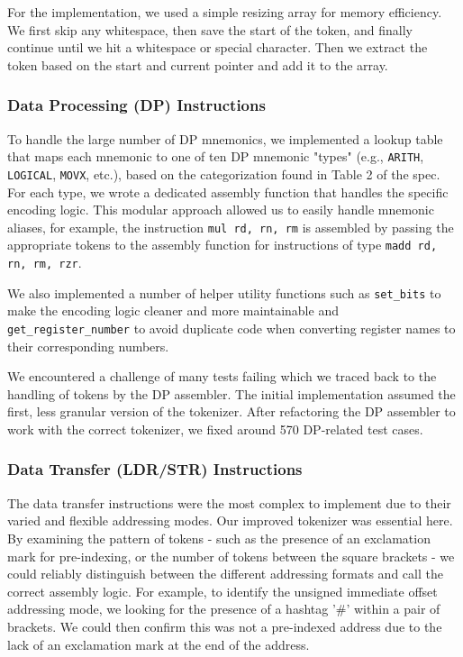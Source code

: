 \documentclass[11pt]{article}
\begin{document}
For the implementation, we used a simple resizing array for memory efficiency.
We first skip any whitespace, then save the start of the token, and finally continue until we hit a whitespace or special character.
Then we extract the token based on the start and current pointer and add it to the array.

\subsubsection{Data Processing (DP) Instructions}
To handle the large number of DP mnemonics, we implemented a lookup table that maps each mnemonic to one of ten DP mnemonic "types" 
(e.g., \texttt{ARITH}, \texttt{LOGICAL}, \texttt{MOVX}, etc.), based on the categorization found in Table 2 of the spec.
For each type, we wrote a dedicated assembly function that handles the specific encoding logic. 
This modular approach allowed us to easily handle mnemonic aliases, for example, the instruction \texttt{mul rd, rn, rm} is 
assembled by passing the appropriate tokens to the assembly function for instructions of type \texttt{madd rd, rn, rm, rzr}.

We also implemented a number of helper utility functions such as \texttt{set\_bits} to make the encoding logic cleaner and more maintainable
and \texttt{get\_register\_number} to avoid duplicate code when converting register names to their corresponding numbers.

We encountered a challenge of many tests failing which we traced back to the handling of tokens by the DP assembler. 
The initial implementation assumed the first, less granular version of the tokenizer.
After refactoring the DP assembler to work with the correct tokenizer, we fixed around 570 DP-related test cases.

\subsubsection{Data Transfer (LDR/STR) Instructions}
The data transfer instructions were the most complex to implement due to their varied and flexible addressing modes. Our improved tokenizer was essential here. By examining the pattern of tokens - such as the presence of an exclamation mark for pre-indexing, or the number of tokens between the square brackets - we could reliably distinguish between the different addressing formats and call the correct assembly logic.
For example, to identify the unsigned immediate offset addressing mode, we looking for the presence of a hashtag '\#' within a pair of brackets. We could then confirm this was not a pre-indexed address due to the lack of an exclamation mark at the end of the address.
\end{document}
